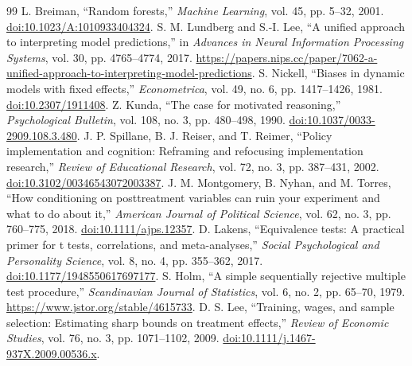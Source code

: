 \begin{thebibliography}{99}
 L. Breiman, ``Random forests,'' \textit{Machine Learning}, vol. 45, pp. 5--32, 2001. \href{https://doi.org/10.1023/A:1010933404324}{doi:10.1023/A:1010933404324}.
 S. M. Lundberg and S.-I. Lee, ``A unified approach to interpreting model predictions,'' in \textit{Advances in Neural Information Processing Systems}, vol. 30, pp. 4765--4774, 2017. \url{https://papers.nips.cc/paper/7062-a-unified-approach-to-interpreting-model-predictions}.
 S. Nickell, ``Biases in dynamic models with fixed effects,'' \textit{Econometrica}, vol. 49, no. 6, pp. 1417--1426, 1981. \href{https://doi.org/10.2307/1911408}{doi:10.2307/1911408}.
 Z. Kunda, ``The case for motivated reasoning,'' \textit{Psychological Bulletin}, vol. 108, no. 3, pp. 480--498, 1990. \href{https://doi.org/10.1037/0033-2909.108.3.480}{doi:10.1037/0033-2909.108.3.480}.
 J. P. Spillane, B. J. Reiser, and T. Reimer, ``Policy implementation and cognition: Reframing and refocusing implementation research,'' \textit{Review of Educational Research}, vol. 72, no. 3, pp. 387--431, 2002. \href{https://doi.org/10.3102/00346543072003387}{doi:10.3102/00346543072003387}.
 J. M. Montgomery, B. Nyhan, and M. Torres, ``How conditioning on posttreatment variables can ruin your experiment and what to do about it,'' \textit{American Journal of Political Science}, vol. 62, no. 3, pp. 760--775, 2018. \href{https://doi.org/10.1111/ajps.12357}{doi:10.1111/ajps.12357}.
 D. Lakens, ``Equivalence tests: A practical primer for t tests, correlations, and meta-analyses,'' \textit{Social Psychological and Personality Science}, vol. 8, no. 4, pp. 355--362, 2017. \href{https://doi.org/10.1177/1948550617697177}{doi:10.1177/1948550617697177}.
 S. Holm, ``A simple sequentially rejective multiple test procedure,'' \textit{Scandinavian Journal of Statistics}, vol. 6, no. 2, pp. 65--70, 1979. \url{https://www.jstor.org/stable/4615733}.
 D. S. Lee, ``Training, wages, and sample selection: Estimating sharp bounds on treatment effects,'' \textit{Review of Economic Studies}, vol. 76, no. 3, pp. 1071--1102, 2009. \href{https://doi.org/10.1111/j.1467-937X.2009.00536.x}{doi:10.1111/j.1467-937X.2009.00536.x}.
\end{thebibliography}
